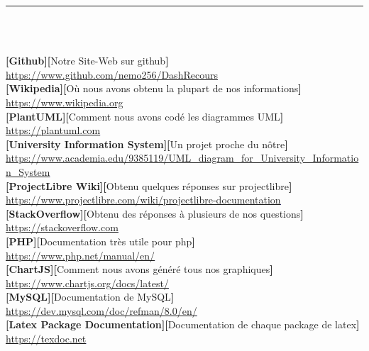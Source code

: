 \documentclass[12pt]{report}
\begin{document}
\begin{center}
    {\color{Blue} \rule{5.5in}{1.4mm} }\\
    \vspace{0.1in}
    \scshape{\fontsize{34}{46}{\bfseries{\color{Blue}{Webographie}}}}
    \\
    \vspace{0.5in}
\end{center}
\large
\renewcommand{\ULdepth}{1.8pt}
\textbf{[Github][}Notre Site-Web sur github\textbf{]}\\
\textcolor{blue}{\uline{\url{https://www.github.com/nemo256/DashRecours}}}
\\
\textbf{[Wikipedia][}Où nous avons obtenu la plupart de nos informations\textbf{]}\\
\textcolor{blue}{\uline{\url{https://www.wikipedia.org}}}
\\
\textbf{[PlantUML][}Comment nous avons codé les diagrammes UML\textbf{]}\\
\textcolor{blue}{\uline{\url{https://plantuml.com}}}
\\
\textbf{[University Information System][}Un projet proche du nôtre\textbf{]}\\
\textcolor{blue}{\uline{\url{https://www.academia.edu/9385119/UML_diagram_for_University_Information_System}}}
\\
\textbf{[ProjectLibre Wiki][}Obtenu quelques réponses sur projectlibre\textbf{]}\\
\textcolor{blue}{\uline{\url{https://www.projectlibre.com/wiki/projectlibre-documentation}}}
\\
\textbf{[StackOverflow][}Obtenu des réponses à plusieurs de nos questions\textbf{]}\\
\textcolor{blue}{\uline{\url{https://stackoverflow.com}}}
\\
\textbf{[PHP][}Documentation très utile pour php\textbf{]}\\
\textcolor{blue}{\uline{\url{https://www.php.net/manual/en/}}}
\\
\textbf{[ChartJS][}Comment nous avons généré tous nos graphiques\textbf{]}\\
\textcolor{blue}{\uline{\url{https://www.chartjs.org/docs/latest/}}}
\\
\textbf{[MySQL][}Documentation de MySQL\textbf{]}\\
\textcolor{blue}{\uline{\url{https://dev.mysql.com/doc/refman/8.0/en/}}}
\\
\textbf{[Latex Package Documentation][}Documentation de chaque package de latex\textbf{]}\\
\textcolor{blue}{\uline{\url{https://texdoc.net}}}
\end{document}
